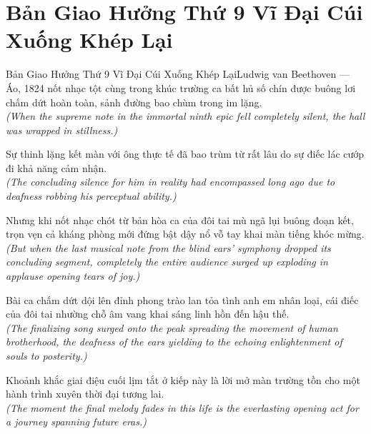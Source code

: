 \section{Bản Giao Hưởng Thứ 9 Vĩ Đại Cúi Xuống Khép Lại}
\begin{truyen}{Bản Giao Hưởng Thứ 9 Vĩ Đại Cúi Xuống Khép Lại}{Ludwig van Beethoven --- Áo, 1824}
 nốt nhạc tột cùng trong khúc trường ca bất hủ số chín được buông lơi chấm dứt hoàn toàn, sảnh đường bao chùm trong im lặng.\\[4pt]
\textit{(When the supreme note in the immortal ninth epic fell completely silent, the hall was wrapped in stillness.)}

Sự thinh lặng kết màn với ông thực tế đã bao trùm từ rất lâu do sự điếc lác cướp đi khả năng cảm nhận.\\[4pt]
\textit{(The concluding silence for him in reality had encompassed long ago due to deafness robbing his perceptual ability.)}

Nhưng khi nốt nhạc chót từ bản hòa ca của đôi tai mù ngã lụi buông đoạn kết, trọn vẹn cả kháng phòng mới đứng bật dậy nổ vỗ tay khai màn tiếng khóc mừng.\\[4pt]
\textit{(But when the last musical note from the blind ears' symphony dropped its concluding segment, completely the entire audience surged up exploding in applause opening tears of joy.)}

Bài ca chấm dứt dội lên đỉnh phong trào lan tỏa tình anh em nhân loại, cái điếc của đôi tai nhường chỗ âm vang khai sáng linh hồn đến hậu thế.\\[4pt]
\textit{(The finalizing song surged onto the peak spreading the movement of human brotherhood, the deafness of the ears yielding to the echoing enlightenment of souls to posterity.)}

\end{truyen}
\begin{baihoc}
  Khoảnh khắc giai điệu cuối lịm tắt ở kiếp này là lời mở màn trường tồn cho một hành trình xuyên thời đại tương lai.\\[4pt]
  \textit{(The moment the final melody fades in this life is the everlasting opening act for a journey spanning future eras.)}
\end{baihoc}

